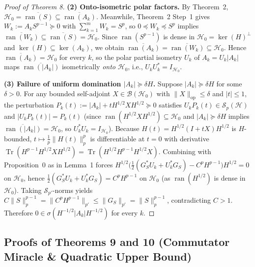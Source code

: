 \documentclass[10pt,letterpaper]{article}
\newcommand{\Hilb}{\mathcal{H}}
\newcommand{\Sp}{\mathcal{S}_p}
\newcommand{\Tr}{\operatorname{Tr}}
\newcommand{\ran}{\operatorname{ran}}
\newcommand{\op}{\mathrm{op}}
\begin{document}
\begin{proof}[Proof of Theorem 8]
\textbf{(2) Onto-isometric polar factors.} By Theorem~2, $\Hilb_0 = \overline{\ran(S)} \subseteq \overline{\ran(A_k)}$. Meanwhile, Theorem~2 Step~1 gives $W_k := A_k S^{p-1} \succeq 0$ with $\sum_{k=1}^m W_k = S^p$, so $0 \preceq W_k \preceq S^p$ implies $\overline{\ran(W_k)} \subseteq \overline{\ran(S)} = \Hilb_0$. Since $\ran(S^{p-1})$ is dense in $\Hilb_0 = \ker(H)^\perp$ and $\ker(H) \subseteq \ker(A_k)$, we obtain $\overline{\ran(A_k)} = \overline{\ran(W_k)} \subseteq \Hilb_0$. Hence $\overline{\ran(A_k)} = \Hilb_0$ for every $k$, so the polar partial isometry $U_k$ of $A_k = U_k|A_k|$ maps $\overline{\ran(|A_k|)}$ isometrically \emph{onto} $\Hilb_0$, i.e., $U_k U_k^* = I_{\Hilb_0}$.

\textbf{(3) Failure of uniform domination $|A_k| \succeq \delta H$.} Suppose $|A_k| \succeq \delta H$ for some $\delta > 0$. For any bounded self-adjoint $X \in \mathcal{B}(\Hilb_0)$ with $\|X\|_{\op} \le \delta$ and $|t| \le 1$, the perturbation $P_k(t) := |A_k| + t H^{1/2} X H^{1/2} \succeq 0$ satisfies $U_k P_k(t) \in \Sp(\Hilb)$ and $|U_k P_k(t)| = P_k(t)$ (since $\ran(H^{1/2} X H^{1/2}) \subseteq \Hilb_0$ and $|A_k| \succeq \delta H$ implies $\overline{\ran(|A_k|)} = \Hilb_0$, so $U_k^* U_k = I_{\Hilb_0}$). Because $H(t) = H^{1/2}(I + tX)H^{1/2}$ is $H$-bounded, $t \mapsto \frac{1}{p}\|H(t)\|_p^p$ is differentiable at $t = 0$ with derivative $\Tr(H^{p-1} H^{1/2} X H^{1/2}) = \Tr(H^{1/2} H^{p-1} H^{1/2} X)$. Combining with Proposition~0 as in Lemma~1 forces $H^{1/2}\bigl(\frac{1}{2}(G_S^* U_k + U_k^* G_S) - C^p H^{p-1}\bigr)H^{1/2} = 0$ on $\Hilb_0$, hence $\frac{1}{2}(G_S^* U_k + U_k^* G_S) = C^p H^{p-1}$ on $\Hilb_0$ (as $\ran(H^{1/2})$ is dense in $\Hilb_0$). Taking $\mathcal{S}_{p'}$-norms yields $C\|S\|_p^{p-1} = \|C^p H^{p-1}\|_{p'} \le \|G_S\|_{p'} = \|S\|_p^{p-1}$, contradicting $C > 1$. Therefore $0 \in \sigma(H^{-1/2}|A_k|H^{-1/2})$ for every $k$.
\end{proof}

\subsection{Proofs of Theorems 9 and 10 (Commutator Miracle \& Quadratic Upper Bound)}
\end{document}
